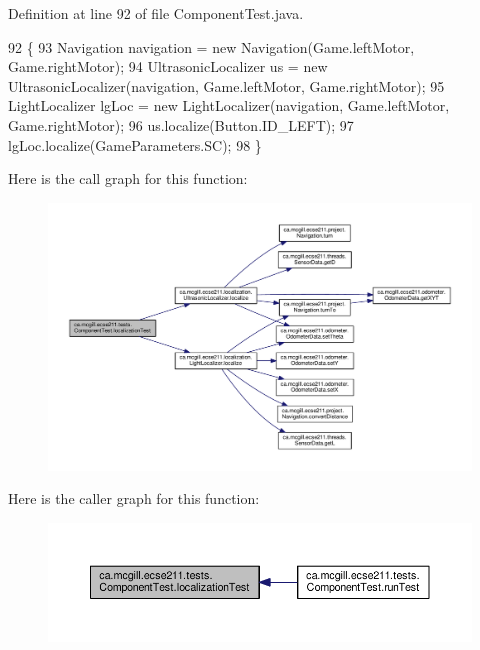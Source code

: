 Definition at line 92 of file Component\+Test.\+java.


\begin{DoxyCode}
92                                                                   \{
93     Navigation navigation = \textcolor{keyword}{new} Navigation(Game.leftMotor, Game.rightMotor);
94     UltrasonicLocalizer us = \textcolor{keyword}{new} UltrasonicLocalizer(navigation, Game.leftMotor, Game.rightMotor);
95     LightLocalizer lgLoc = \textcolor{keyword}{new} LightLocalizer(navigation, Game.leftMotor, Game.rightMotor);
96     us.localize(Button.ID\_LEFT);
97     lgLoc.localize(GameParameters.SC);
98   \}
\end{DoxyCode}
Here is the call graph for this function\+:
\nopagebreak
\begin{figure}[H]
\begin{center}
\leavevmode
\includegraphics[width=350pt]{enumca_1_1mcgill_1_1ecse211_1_1tests_1_1_component_test_ad11712dd74c5c64e84cd71186a59a087_cgraph}
\end{center}
\end{figure}
Here is the caller graph for this function\+:
\nopagebreak
\begin{figure}[H]
\begin{center}
\leavevmode
\includegraphics[width=350pt]{enumca_1_1mcgill_1_1ecse211_1_1tests_1_1_component_test_ad11712dd74c5c64e84cd71186a59a087_icgraph}
\end{center}
\end{figure}
\mbox{\label{enumca_1_1mcgill_1_1ecse211_1_1tests_1_1_component_test_aa40592bb550b3526402faddbc0d890c7}} 
